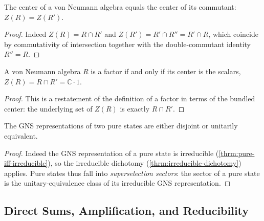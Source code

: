 \begin{theorem}
  \label{thrm:center-eq-commutant-center}
  \leanok
  The center of a von Neumann algebra equals the center of its commutant: $Z(R) = Z(R')$.
\end{theorem}
\begin{proof}
  \leanok
  Indeed $Z(R) = R \cap R'$ and $Z(R') = R' \cap R'' = R' \cap R$, which coincide by commutativity of intersection together with the double-commutant identity $R'' = R$.
\end{proof}

\begin{theorem}
  \label{thrm:factor-iff-center-scalars}
  \leanok
  A von Neumann algebra $R$ is a factor if and only if its center is the scalars, $Z(R) = R \cap R' = \mathbb{C}\cdot 1$.
\end{theorem}
\begin{proof}
  \leanok
  This is a restatement of the definition of a factor in terms of the bundled center: the underlying set of $Z(R)$ is exactly $R \cap R'$.
\end{proof}

\begin{theorem}
    \label{thrm:pure-state-dichotomy}
    \leanok
    The GNS representations of two pure states are either disjoint or unitarily equivalent.
\end{theorem}
\begin{proof}
    \leanok
    Indeed the GNS representation of a pure state is irreducible (\ref{thrm:pure-iff-irreducible}), so the irreducible dichotomy (\ref{thrm:irreducible-dichotomy}) applies. Pure states thus fall into \emph{superselection sectors}: the sector of a pure state is the unitary-equivalence class of its irreducible GNS representation.
\end{proof}

\subsection{Direct Sums, Amplification, and Reducibility}

